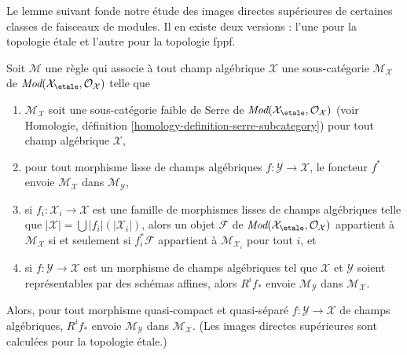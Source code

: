 \noindent
Le lemme suivant fonde notre étude des
images directes supérieures de certaines classes de faisceaux de modules.
Il en existe deux versions : l'une pour la topologie étale et
l'autre pour la topologie fppf.

\begin{lemma}
\label{lemma-general-pushforward}
Soit $\mathcal{M}$ une règle qui associe à tout champ algébrique
$\mathcal{X}$ une sous-catégorie $\mathcal{M}_\mathcal{X}$ de
$\textit{Mod}(\mathcal{X}_\etale, \mathcal{O}_\mathcal{X})$
telle que
\begin{enumerate}
\item $\mathcal{M}_\mathcal{X}$ soit une sous-catégorie faible de Serre
de $\textit{Mod}(\mathcal{X}_\etale, \mathcal{O}_\mathcal{X})$
(voir Homologie, définition \ref{homology-definition-serre-subcategory})
pour tout champ algébrique $\mathcal{X}$,
\item pour tout morphisme lisse de champs algébriques
$f : \mathcal{Y} \to \mathcal{X}$, le foncteur $f^*$ envoie
$\mathcal{M}_\mathcal{X}$ dans $\mathcal{M}_\mathcal{Y}$,
\item si $f_i : \mathcal{X}_i \to \mathcal{X}$ est une famille de morphismes
lisses de champs algébriques telle que
$|\mathcal{X}| = \bigcup |f_i|(|\mathcal{X}_i|)$, alors un objet
$\mathcal{F}$ de
$\textit{Mod}(\mathcal{X}_\etale, \mathcal{O}_\mathcal{X})$
appartient à $\mathcal{M}_\mathcal{X}$ si et seulement si
$f_i^*\mathcal{F}$ appartient à $\mathcal{M}_{\mathcal{X}_i}$ pour tout $i$, et
\item si $f : \mathcal{Y} \to \mathcal{X}$ est un morphisme de champs
algébriques tel que $\mathcal{X}$ et $\mathcal{Y}$ soient représentables
par des schémas affines, alors $R^if_*$ envoie $\mathcal{M}_\mathcal{Y}$
dans $\mathcal{M}_\mathcal{X}$.
\end{enumerate}
Alors, pour tout morphisme quasi-compact et quasi-séparé
$f : \mathcal{Y} \to \mathcal{X}$ de champs algébriques,
$R^if_*$ envoie $\mathcal{M}_\mathcal{Y}$
dans $\mathcal{M}_\mathcal{X}$. (Les images directes supérieures sont calculées pour la topologie
étale.)
\end{lemma}

